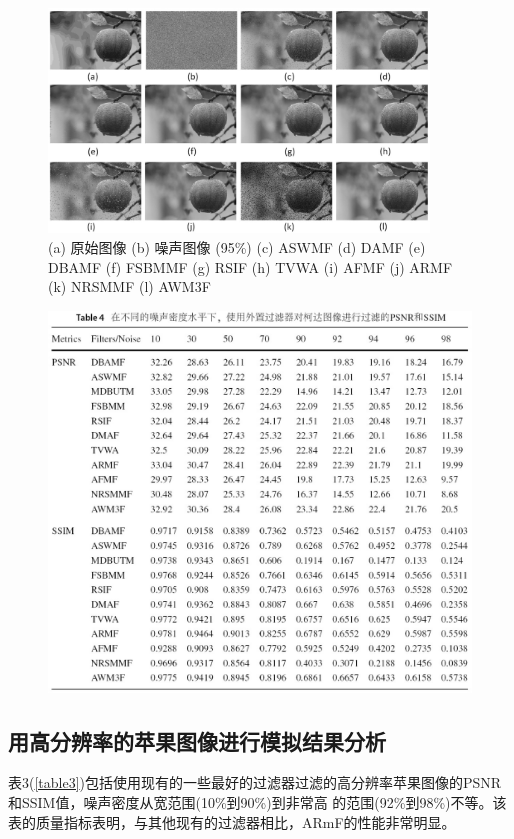\documentclass[12pt]{article} %
\begin{document}
\begin{figure}[H]
    \centering
    \includegraphics[width=0.9\textwidth]{images/09.eps}
    \caption{(a) 原始图像 (b) 噪声图像 (95\%) (c) ASWMF (d) DAMF (e) DBAMF (f) FSBMMF (g) RSIF (h) TVWA (i) AFMF (j) ARMF (k) NRSMMF (l) AWM3F}
\end{figure}

\begin{figure}[H]
    \centering
    \includegraphics[width=1\textwidth]{images/10.eps}
    \label{table4}
\end{figure}

\subsection{用高分辨率的苹果图像进行模拟结果分析}
表3(\ref{table3})包括使用现有的一些最好的过滤器过滤的高分辨率苹果图像的PSNR和SSIM值，噪声密度从宽范围(10\%到90\%)到非常高
的范围(92\%到98\%)不等。该表的质量指标表明，与其他现有的过滤器相比，ARmF\cite{ref8}的性能非常明显。
\end{document}
